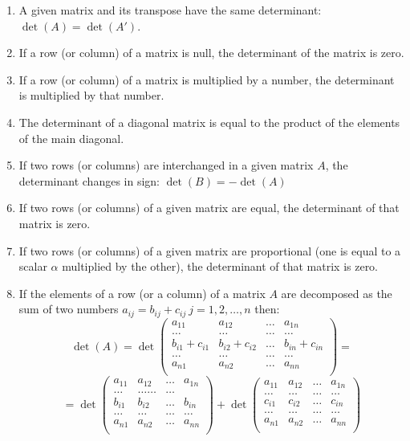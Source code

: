 \documentclass[a4paper,11pt]{article}
\theoremstyle{definition}
\theoremstyle{plain}
\begin{document}
\begin{enumerate}
\def\labelenumi{\arabic{enumi}.}
\item
  A given matrix and its transpose have the same determinant:
  \(\det(A) = \det(A')\).
\item
  If a row (or column) of a matrix is null, the determinant of the
  matrix is zero.
\item
  If a row (or column) of a matrix is multiplied by a number, the
  determinant is multiplied by that number.
\item
  The determinant of a diagonal matrix is equal to the product of the
  elements of the main diagonal.
\item
  If two rows (or columns) are interchanged in a given matrix \(A\), the
  determinant changes in sign: \(\det(B) = -\det(A)\)
\item
  If two rows (or columns) of a given matrix are equal, the determinant
  of that matrix is zero.
\item
  If two rows (or columns) of a given matrix are proportional (one is
  equal to a scalar \(\alpha\) multiplied by the other), the determinant
  of that matrix is zero.
\item
  If the elements of a row (or a column) of a matrix \(A\) are
  decomposed as the sum of two numbers
  \(a_{ij} = b_{ij} + c_{ij} \: j = 1, 2, \ldots, n\) then: \[
  \det(A)  = \det \begin{pmatrix} a_{11} & a_{12} & \ldots & a_{1n} \\ \ldots & \ldots & \ldots & \ldots \\ b_{i1}+c_{i1} & b_{i2}+c_{i2} & \ldots & b_{in}+c_{in} \\  \ldots & \ldots & \ldots & \ldots \\ a_{n1} & a_{n2} & \ldots & a_{nn} \\ \end{pmatrix} =
  \] \[
  = \det \begin{pmatrix}  a_{11} & a_{12} & \ldots & a_{1n} \\ \ldots & \ldots  \ldots & \ldots \\ b_{i1} & b_{i2} & \ldots & b_{in} \\ \ldots & \ldots& \ldots & \ldots \\ a_{n1} & a_{n2} & \ldots & a_{nn} \\ \end{pmatrix} +  \det \begin{pmatrix}    a_{11} & a_{12} & \ldots & a_{1n} \\ \ldots & \ldots & \ldots & \ldots \\ c_{i1} & c_{i2} & \ldots & c_{in} \\ \ldots & \ldots & \ldots & \ldots \\ a_{n1} & a_{n2} & \ldots & a_{nn} \\ \end{pmatrix}
\]
\end{enumerate}
\end{document}
